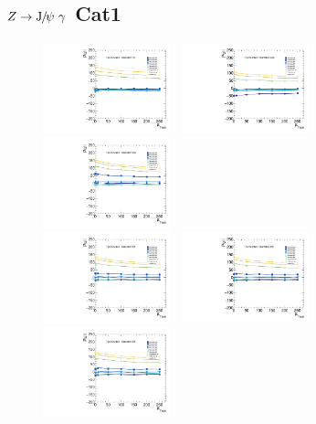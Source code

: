 \subsection{$Z\to \JPsi\ \gamma$ Cat1}
\begin{figure}[!ht]
  \centering
  \includegraphics[width=0.33\textwidth]{Fig/BiasStudy/Linearity/ZJpsiG_Cat1/pull_mean_linearity_TrueFunc0}~
  \includegraphics[width=0.33\textwidth]{Fig/BiasStudy/Linearity/ZJpsiG_Cat1/pull_mean_linearity_TrueFunc1}~
  \includegraphics[width=0.33\textwidth]{Fig/BiasStudy/Linearity/ZJpsiG_Cat1/pull_mean_linearity_TrueFunc2}\\
  \includegraphics[width=0.33\textwidth]{Fig/BiasStudy/Linearity/ZJpsiG_Cat1/pull_mean_linearity_TrueFunc3}~
  \includegraphics[width=0.33\textwidth]{Fig/BiasStudy/Linearity/ZJpsiG_Cat1/pull_mean_linearity_TrueFunc4}~
  \includegraphics[width=0.33\textwidth]{Fig/BiasStudy/Linearity/ZJpsiG_Cat1/pull_mean_linearity_TrueFunc5}\\

\end{figure}
